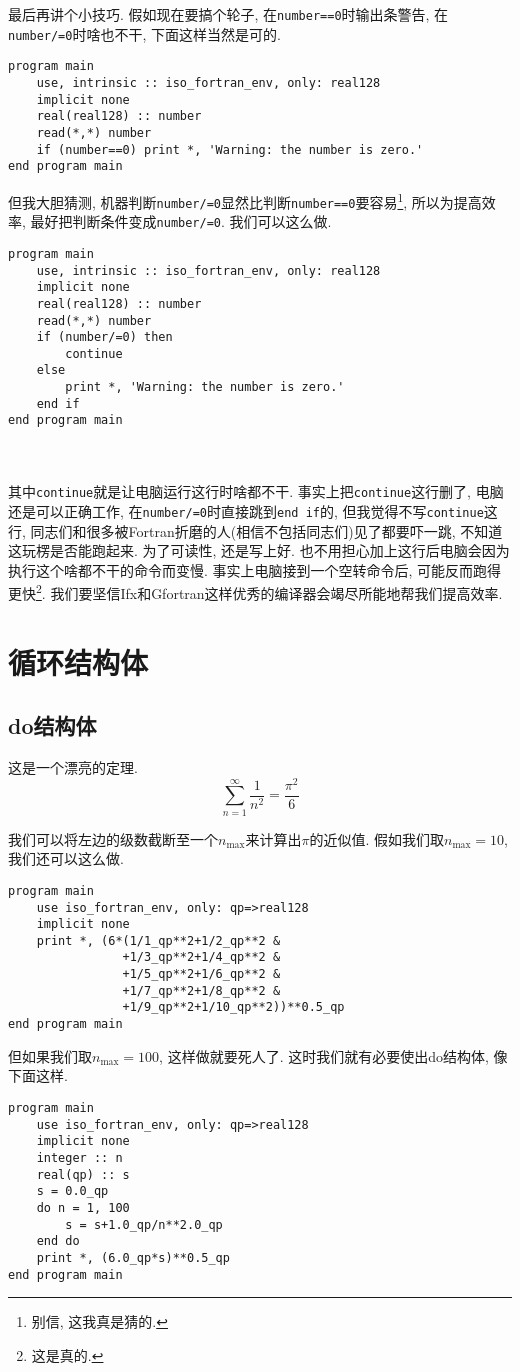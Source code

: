 最后再讲个小技巧. 假如现在要搞个轮子, 在\texttt{number==0}时输出条警告, 在\texttt{number/=0}时啥也不干, 下面这样当然是可的.
\begin{lstlisting}
program main
    use, intrinsic :: iso_fortran_env, only: real128
    implicit none
    real(real128) :: number
    read(*,*) number
    if (number==0) print *, 'Warning: the number is zero.'
end program main
\end{lstlisting}
但我大胆猜测, 机器判断\texttt{number/=0}显然比判断\texttt{number==0}要容易\footnote{
    别信, 这我真是猜的.
}, 所以为提高效率, 最好把判断条件变成\texttt{number/=0}. 我们可以这么做.
\begin{lstlisting}
program main
    use, intrinsic :: iso_fortran_env, only: real128
    implicit none
    real(real128) :: number
    read(*,*) number
    if (number/=0) then
        continue
    else
        print *, 'Warning: the number is zero.'
    end if
end program main
\end{lstlisting}
\mbox{}\\\mbox{}\\
其中\texttt{continue}就是让电脑运行这行时啥都不干. 事实上把\texttt{continue}这行删了, 电脑还是可以正确工作, 在\texttt{number/=0}时直接跳到\texttt{end if}的, 但我觉得不写\texttt{continue}这行, 同志们和很多被Fortran折磨的人(相信不包括同志们)见了都要吓一跳, 不知道这玩楞是否能跑起来. 为了可读性, 还是写上好. 也不用担心加上这行后电脑会因为执行这个啥都不干的命令而变慢. 事实上电脑接到一个空转命令后, 可能反而跑得更快\footnote{
    这是真的.
}. 我们要坚信Ifx和Gfortran这样优秀的编译器会竭尽所能地帮我们提高效率.

\section{循环结构体}

\subsection{do结构体}

这是一个漂亮的定理.
\begin{equation*}
    \sum_{n=1}^{\infty} \frac{1}{n^2} = \frac{\pi^2}{6}
\end{equation*}

我们可以将左边的级数截断至一个$n_{\text{max}}$来计算出$\pi$的近似值. 假如我们取$n_{\text{max}}=10$, 我们还可以这么做.
\begin{lstlisting}
program main
    use iso_fortran_env, only: qp=>real128
    implicit none
    print *, (6*(1/1_qp**2+1/2_qp**2 &
                +1/3_qp**2+1/4_qp**2 &
                +1/5_qp**2+1/6_qp**2 &
                +1/7_qp**2+1/8_qp**2 &
                +1/9_qp**2+1/10_qp**2))**0.5_qp
end program main
\end{lstlisting}
但如果我们取$n_{\text{max}}=100$, 这样做就要死人了. 这时我们就有必要使出do结构体, 像下面这样.\newpage
\begin{lstlisting}
program main
    use iso_fortran_env, only: qp=>real128
    implicit none
    integer :: n
    real(qp) :: s
    s = 0.0_qp
    do n = 1, 100
        s = s+1.0_qp/n**2.0_qp
    end do
    print *, (6.0_qp*s)**0.5_qp
end program main
\end{lstlisting}

